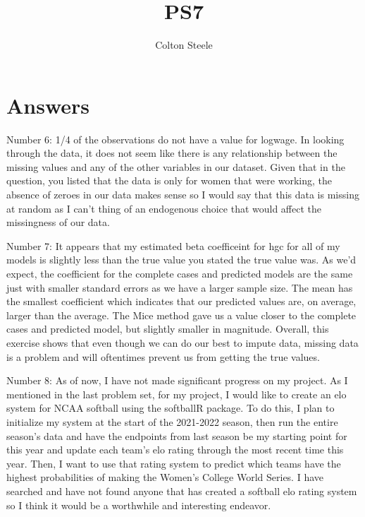 \documentclass{article}
\title{PS7}
\author{Colton Steele}
\begin{document}
\maketitle


\section{Answers}

Number 6:
1/4 of the observations do not have a value for logwage. In looking through the data, it does not seem like there is any relationship between the missing values and any of the other variables in our dataset. Given that in the question, you listed that the data is only for women that were working, the absence of zeroes in our data makes sense so I would say that this data is missing at random as I can't thing of an endogenous choice that would affect the missingness of our data.


Number 7: It appears that my estimated beta coefficeint for hgc for all of my models is slightly less than the true value you stated the true value was. As we'd expect, the coefficient for the complete cases and predicted models are the same just with smaller standard errors as we have a larger sample size. The mean has the smallest coefficient which indicates that our predicted values are, on average, larger than the average. The Mice method gave us a value closer to the complete cases and predicted model, but slightly smaller in magnitude. Overall, this exercise shows that even though we can do our best to impute data, missing data is a problem and will oftentimes prevent us from getting the true values.



Number 8: As of now, I have not made significant progress on my project. As I mentioned in the last problem set, for my project, I would like to create an elo system for NCAA softball using the softballR package. To do this, I plan to initialize my system at the start of the 2021-2022 season, then run the entire season's data and have the endpoints from last season be my starting point for this year and update each team's elo rating through the most recent time this year. Then, I want to use that rating system to predict which teams have the highest probabilities of making the Women's College World Series. I have searched and have not found anyone that has created a softball elo rating system so I think it would be a worthwhile and interesting endeavor.
\end{document}
